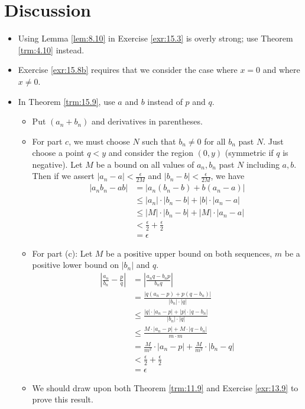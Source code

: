 \documentclass{report}
\begin{document}
\section{Discussion}
\begin{itemize}
    \item {}Using Lemma \ref{lem:8.10} in Exercise \ref{exr:15.3} is overly strong; use Theorem \ref{trm:4.10} instead.
    \item {}Exercise \ref{exr:15.8b} requires that we consider the case where $x=0$ and where $x\neq 0$.
    \item In Theorem \ref{trm:15.9}, use $a$ and $b$ instead of $p$ and $q$.
    \begin{itemize}
        \item Put $(a_n+b_n)$ and derivatives in parentheses.
        \item For part $c$, we must choose $N$ such that $b_n\neq 0$ for all $b_n$ past $N$. Just choose a point $q<y$ and consider the region $(0,y)$ (symmetric if $q$ is negative). Let $M$ be a bound on all values of $a_n,b_n$ past $N$ including $a,b$. Then if we assert $|a_n-a|<\frac{\epsilon}{2M}$ and $|b_n-b|<\frac{\epsilon}{2M}$, we have
        \begin{align*}
            |a_nb_n-ab| &= |a_n(b_n-b)+b(a_n-a)|\\
            &\leq |a_n|\cdot|b_n-b|+|b|\cdot|a_n-a|\\
            &\leq |M|\cdot|b_n-b|+|M|\cdot|a_n-a|\\
            &< \frac{\epsilon}{2}+\frac{\epsilon}{2}\\
            &= \epsilon
        \end{align*}
        \item For part (c): Let $M$ be a positive upper bound on both sequences, $m$ be a positive lower bound on $|b_n|$ and $q$.
        \begin{align*}
            \left| \frac{a_n}{b_n}-\frac{p}{q} \right| &= \left| \frac{a_nq-b_np}{b_nq} \right|\\
            &= \frac{|q(a_n-p)+p(q-b_n)|}{|b_n|\cdot|q|}\\
            &\leq \frac{|q|\cdot|a_n-p|+|p|\cdot|q-b_n|}{|b_n|\cdot|q|}\\
            &\leq \frac{M\cdot|a_n-p|+M\cdot|q-b_n|}{m\cdot m}\\
            &= \frac{M}{m^2}\cdot|a_n-p|+\frac{M}{m^2}\cdot|b_n-q|\\
            &< \frac{\epsilon}{2}+\frac{\epsilon}{2}\\
            &= \epsilon
        \end{align*}
        \item We should draw upon both Theorem \ref{trm:11.9} and Exercise \ref{exr:13.9} to prove this result.
    \end{itemize}
\end{itemize}
\end{document}

